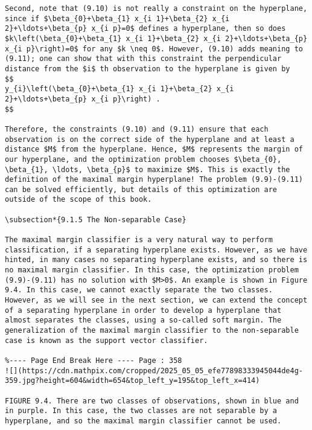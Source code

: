 \documentclass[10pt]{article}
\begin{document}
\begin{verbatim}
Second, note that (9.10) is not really a constraint on the hyperplane, since if $\beta_{0}+\beta_{1} x_{i 1}+\beta_{2} x_{i 2}+\ldots+\beta_{p} x_{i p}=0$ defines a hyperplane, then so does $k\left(\beta_{0}+\beta_{1} x_{i 1}+\beta_{2} x_{i 2}+\ldots+\beta_{p} x_{i p}\right)=0$ for any $k \neq 0$. However, (9.10) adds meaning to (9.11); one can show that with this constraint the perpendicular distance from the $i$ th observation to the hyperplane is given by
$$
y_{i}\left(\beta_{0}+\beta_{1} x_{i 1}+\beta_{2} x_{i 2}+\ldots+\beta_{p} x_{i p}\right) .
$$

Therefore, the constraints (9.10) and (9.11) ensure that each observation is on the correct side of the hyperplane and at least a distance $M$ from the hyperplane. Hence, $M$ represents the margin of our hyperplane, and the optimization problem chooses $\beta_{0}, \beta_{1}, \ldots, \beta_{p}$ to maximize $M$. This is exactly the definition of the maximal margin hyperplane! The problem (9.9)-(9.11) can be solved efficiently, but details of this optimization are outside of the scope of this book.

\subsection*{9.1.5 The Non-separable Case}

The maximal margin classifier is a very natural way to perform classification, if a separating hyperplane exists. However, as we have hinted, in many cases no separating hyperplane exists, and so there is no maximal margin classifier. In this case, the optimization problem (9.9)-(9.11) has no solution with $M>0$. An example is shown in Figure 9.4. In this case, we cannot exactly separate the two classes. However, as we will see in the next section, we can extend the concept of a separating hyperplane in order to develop a hyperplane that almost separates the classes, using a so-called soft margin. The generalization of the maximal margin classifier to the non-separable case is known as the support vector classifier.

%---- Page End Break Here ---- Page : 358
![](https://cdn.mathpix.com/cropped/2025_05_05_efe77898333945044de4g-359.jpg?height=604&width=654&top_left_y=195&top_left_x=414)

FIGURE 9.4. There are two classes of observations, shown in blue and in purple. In this case, the two classes are not separable by a hyperplane, and so the maximal margin classifier cannot be used.


\end{verbatim}
\end{document}
